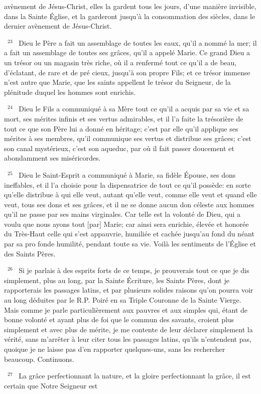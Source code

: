 \documentclass[paper=a5,pagesize=pdftex,fontsize=15pt,headinclude=on,twoside=off]{scrbook}
\newcommand{\negphantom}[1]{\settowidth{\dimen0}{#1}\hspace*{-\dimen0}}
\newcommand{\versenb}[1]{\par \vspace{10pt}~\negphantom{~${}^{#1}$~}${}^{#1}$~}
\begin{document}
avènement de Jésus-Christ, elles la gardent tous les jours, d'une manière invisible, dans la Sainte Église, et la
garderont jusqu'à la consommation des siècles, dans le dernier avènement de Jésus-Christ.
\versenb{23} Dieu le Père a fait un assemblage de toutes les eaux, qu'il a nommé la mer; il a fait un assemblage de toutes
ses grâces, qu'il a appelé Marie. Ce grand Dieu a un trésor ou un magasin très riche, où il a renfermé tout ce qu'il
a de beau, d'éclatant, de rare et de pré cieux, jusqu'à son propre Fils; et ce trésor immense n'est autre que Marie,
que les saints appellent le trésor du Seigneur, de la plénitude duquel les hommes sont enrichis.
\versenb{24} Dieu le Fils a communiqué à sa Mère tout ce qu'il a acquis par sa vie et sa mort, ses mérites infinis et ses
vertus admirables, et il l'a faite la trésorière de tout ce que son Père lui a donné en héritage; c'est par elle qu'il
applique ses mérites à ses membres, qu'il communique ses vertus et distribue ses grâces; c'est son canal
mystérieux, c'est son aqueduc, par où il fait passer doucement et abondamment ses miséricordes.
\versenb{25} Dieu le Saint-Esprit a communiqué à Marie, sa fidèle Épouse, ses dons ineffables, et il l'a choisie pour la
dispensatrice de tout ce qu'il possède: en sorte qu'elle distribue à qui elle veut, autant qu'elle veut, comme elle
veut et quand elle veut, tous ses dons et ses grâces, et il ne se donne aucun don céleste aux hommes qu'il ne
passe par ses mains virginales. Car telle est la volonté de Dieu, qui a voulu que nous ayons tout [par] Marie; car
ainsi sera enrichie, élevée et honorée du Très-Haut celle qui s'est appauvrie, humiliée et cachée jusqu'au fond du
néant par sa pro fonde humilité, pendant toute sa vie. Voilà les sentiments de l'Église et des Saints Pères.
\versenb{26} Si je parlais à des esprits forts de ce temps, je prouverais tout ce que je dis simplement, plus au long, par la
Sainte Écriture, les Saints Pères, dont je rapporterais les passages latins, et par plusieurs solides raisons qu'on
pourra voir au long déduites par le R.P. Poiré en sa Triple Couronne de la Sainte Vierge. Mais comme je parle
particulièrement aux pauvres et aux simples qui, étant de bonne volonté et ayant plus de foi que le commun des
savants, croient plus simplement et avec plus de mérite, je me contente de leur déclarer simplement la vérité, sans
m'arrêter à leur citer tous les passages latins, qu'ils n'entendent pas, quoique je ne laisse pas d'en rapporter
quelques-uns, sans les rechercher beaucoup. Continuons.
\versenb{27} La grâce perfectionnant la nature, et la gloire perfectionnant la grâce, il est certain que Notre Seigneur est
\end{document}
